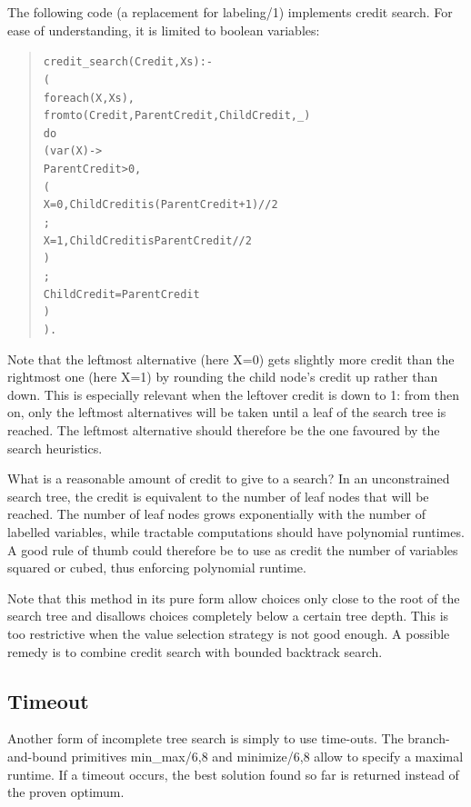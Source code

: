 The following code (a replacement for labeling/1)
implements credit search. For ease of understanding, it is
limited to boolean variables:
\begin{quote}\begin{alltt}
credit_search(Credit, Xs) :-
        (
            foreach(X, Xs),
            fromto(Credit, ParentCredit, ChildCredit, _)
        do
            ( var(X) ->
                ParentCredit > 0,  %
                ( %
                    X = 0, ChildCredit is (ParentCredit+1)//2
                ;
                    X = 1, ChildCredit is ParentCredit//2
                )
            ;
                ChildCredit = ParentCredit
            )
        ).
\end{alltt}\end{quote}
Note that the leftmost alternative (here X=0)
gets slightly more credit than the rightmost one (here X=1)
by rounding the child node's credit up rather than down. 
This is especially relevant when the leftover credit is down to 1:
from then on, only the leftmost alternatives will be taken until a
leaf of the search tree is reached. The leftmost alternative should
therefore be the one favoured by the search heuristics.

What is a reasonable amount of credit to give to a search?
In an unconstrained search tree, the credit is equivalent to the
number of leaf nodes that will be reached.
The number of leaf nodes grows exponentially with the number of
labelled variables, while tractable computations should have
polynomial runtimes. A good rule of thumb could therefore be to
use as credit the number of variables squared or cubed, thus enforcing
polynomial runtime.

Note that this method in its pure form allow choices only close to the
root of the search tree and disallows choices completely below a certain
tree depth. This is too restrictive when the value selection strategy
is not good enough. A possible remedy is to combine credit search with
bounded backtrack search.


\subsection{Timeout}

Another form of incomplete tree search is simply to use time-outs.
The branch-and-bound primitives min\_max/6,8 and minimize/6,8 allow
to specify a maximal runtime. If a timeout occurs, the best solution
found so far is returned instead of the proven optimum.

